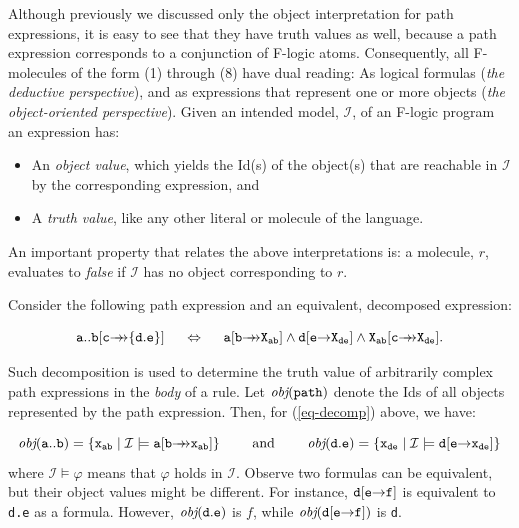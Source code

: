 \documentclass[11pt]{article}
\newcommand{\obj}{\textit{obj}\xspace}
\newcommand{\db}[1]{\ensuremath{\mathcal{#1}}}
\newcommand{\fd}{\ensuremath{{\rightarrow}}}                   %
\newcommand{\mvd}{\ensuremath{{\rightarrow\!\!\!\!\rightarrow}}}  %
\newcommand{\fl}{\mbox{F-logic}\xspace}
\begin{document}
Although previously we discussed only the object interpretation for path
expressions, it is easy to see that they have truth values as well, because
a path expression corresponds to a conjunction of F-logic atoms.
Consequently, all F-molecules of the form (1) through (8) have dual
reading: As logical formulas (\emph{the deductive perspective}), and as
expressions that represent one or more objects (\emph{the object-oriented
  perspective}).  Given an intended model, \db I, of an \fl program an
expression has:
\begin{itemize}
\item An \emph{object value}, which yields the Id(s) of the object(s)
  that are reachable in \db I by the corresponding expression, and 
\item A \emph{truth value}, like any other literal or molecule of the
  language. 
\end{itemize}
An important property that relates the above interpretations is: a
molecule, $r$, evaluates to \emph{false} if \db I has no object
corresponding to $r$.


Consider the following path expression and an equivalent, decomposed
expression:

\begin{equation}\label{eq-decomp}
\tt
a..b[c\mvd\{d.e\}] \quad\ \Leftrightarrow \quad\  a[b\mvd X_{ab}]
\land d[e\fd X_{de}] \land X_{ab}[c\mvd X_{de}]. 
\end{equation}

\noindent
Such decomposition is used to determine the truth value of arbitrarily complex
path expressions in the \emph{body} of a rule.  Let $\tt \obj(path)$ denote
the Ids of all objects represented by the path expression. Then, for
(\ref{eq-decomp}) above, we have:

\begin{displaymath} \tt
\obj(a..b) = \{x_{ab} \mid \db I \models a[b\mvd x_{ab} ]\}
\qquad\textrm{ and }\qquad \obj(d.e) = \{x_{de} \mid \db I \models d[e\fd 
x_{de}]\} 
\end{displaymath}
%
where $\db I \models \varphi$ means that $\varphi$ holds in \db I.  Observe
two formulas can be equivalent, but their object values might be different.
For instance, $\tt d[e\fd f]$ is equivalent to {\tt d.e} as a formula.
However, $\tt \obj(d.e)$ is $f$, while $\tt \obj(d[e\fd f])$ is {\tt d}.
\end{document}
